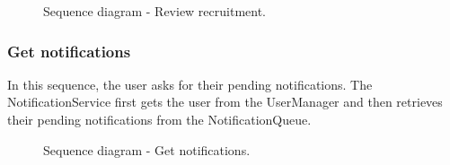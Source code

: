 \begin{figure}[H]
    \centering
    \caption{\label{fig:sequence-review-recruitment}Sequence diagram - Review recruitment.}
\end{figure}

\subsubsection{Get notifications}
In this sequence, the user asks for their pending notifications.
The NotificationService first gets the user from the UserManager and then retrieves their pending notifications from the NotificationQueue.

\begin{figure}[H]
    \centering
    \caption{\label{fig:sequence-get-notifications}Sequence diagram - Get notifications.}
\end{figure}

